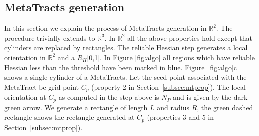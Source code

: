 

\subsection {MetaTracts generation}
\label{subsec:MetaTracts-generation}
 In this section we explain the process of MetaTracts generation in $\mathbb{R}^2$. The procedure trivially extends to $\mathbb{R}^3$. In $\mathbb{R}^2$ all the above properties hold except that cylinders are replaced by rectangles. The reliable Hessian step  generates a local orientation in $\mathbb{R}^2$ and a $R_H$[0,1]. In Figure \ref{fig:algo} all regions which have reliable Hessian less than the threshold have been marked in blue. Figure~\ref{fig:algo}c shows a single cylinder of a MetaTracts. Let the seed point associated with the MetaTract be grid point $C_{p}$ (property 2 in Section~\ref{subsec:mtprop}). The local orientation at $C_p$ as computed in the step above is $N_P$ and is given by the dark green arrow. We generate a rectangle of length $L$ and radius $R$, the green dashed rectangle shows the rectangle generated at $C_p$ (properties 3 and 5 in Section~\ref{subsec:mtprop}). 

